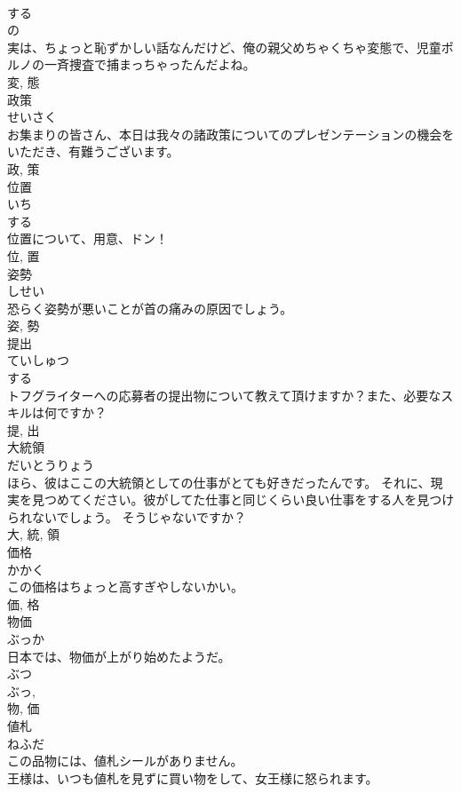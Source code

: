 \documentclass[8pt]{extreport}
\begin{document}
\begin{CJK}{UTF8}{min}
\\	する 
\\	の 
\\	実は、ちょっと恥ずかしい話なんだけど、俺の親父めちゃくちゃ変態で、児童ポルノの一斉捜査で捕まっちゃったんだよね。	
\\	変, 態	
\\	政策	
\\	せいさく	
\\	お集まりの皆さん、本日は我々の諸政策についてのプレゼンテーションの機会をいただき、有難うございます。	
\\	政, 策	
\\	位置	
\\	いち	
\\	する 
\\	位置について、用意、ドン！	
\\	位, 置	
\\	姿勢	
\\	しせい	
\\	恐らく姿勢が悪いことが首の痛みの原因でしょう。	
\\	姿, 勢	
\\	提出	
\\	ていしゅつ	
\\	する 
\\	トフグライターへの応募者の提出物について教えて頂けますか？また、必要なスキルは何ですか？	
\\	提, 出	
\\	大統領	
\\	だいとうりょう	
\\	ほら、彼はここの大統領としての仕事がとても好きだったんです。 それに、現実を見つめてください。彼がしてた仕事と同じくらい良い仕事をする人を見つけられないでしょう。 そうじゃないですか？	
\\	大, 統, 領	
\\	価格	
\\	かかく	
\\	この価格はちょっと高すぎやしないかい。	
\\	価, 格	
\\	物価	
\\	ぶっか	
\\	日本では、物価が上がり始めたようだ。	
\\	ぶつ 
\\	ぶっ, 
\\	物, 価	
\\	値札	
\\	ねふだ	
\\	この品物には、値札シールがありません。	
\\	王様は、いつも値札を見ずに買い物をして、女王様に怒られます。	

\end{CJK}
\end{document}

